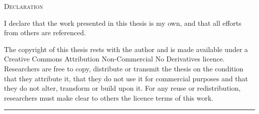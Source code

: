 \vspace*{140px}
\begin{center}
\textsc{\LARGE Declaration}
\end{center}
I declare that the work presented in this thesis is my own, and that all efforts from others are referenced. 

The copyright of this thesis rests with the author and is made available under a Creative Commons Attribution Non-Commercial No Derivatives licence. Researchers are free to copy, distribute or transmit the thesis on the condition that they attribute it, that they do not use it for commercial purposes and that they do not alter, transform or build upon it. For any reuse or redistribution, researchers must make clear to others the licence terms of this work. 

\begin{center}
\rule{125px}{0.2px}
\end{center}
\vfill
\pagebreak